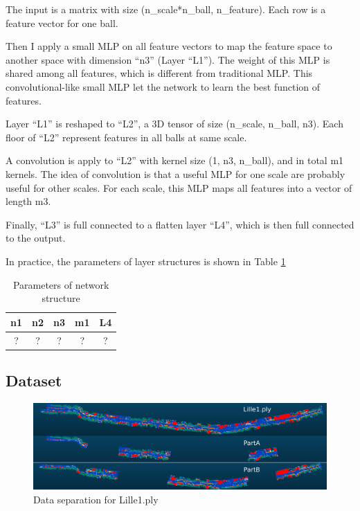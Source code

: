 \documentclass{article}
\begin{document}
The input is a matrix with size (n\_scale*n\_ball, n\_feature). Each row is a feature vector for one ball. 

Then I apply a small MLP on all feature vectors to map the feature space to another space with dimension ``n3'' (Layer ``L1''). The weight of this MLP is shared among all features, which is different from traditional MLP. This convolutional-like small MLP let the network to learn the best function of features.

Layer ``L1'' is reshaped to ``L2'', a 3D tensor of size (n\_scale, n\_ball, n3). Each floor of ``L2'' represent features in all balls at same scale.

A convolution is apply to ``L2'' with kernel size (1, n3, n\_ball), and in total m1 kernels. The idea of convolution is that a useful MLP for one scale are probably useful for other scales. For each scale, this MLP maps all features into a vector of length m3.

Finally, ``L3'' is full connected to a flatten layer ``L4'', which is then full connected to the output.

In practice, the parameters of layer structures is shown in Table \ref{table:3}

\begin{table}[h!]
	\centering
	\begin{tabular}{|c|c|c|c|c|} 
		\hline
		n1 & n2 & n3 & m1 & L4\\
		\hline
		? & ? & ? & ? & ?\\
		\hline
	\end{tabular}
	\caption{Parameters of network structure}
	\label{table:3}
\end{table}


\subsection{Dataset}
\begin{figure}[h]
	\centering
	\includegraphics[width=12cm]{Lille1_cut.png}
	\caption{Data separation for Lille1.ply}
	\label{fig:lill1}
\end{figure}
\end{document}
